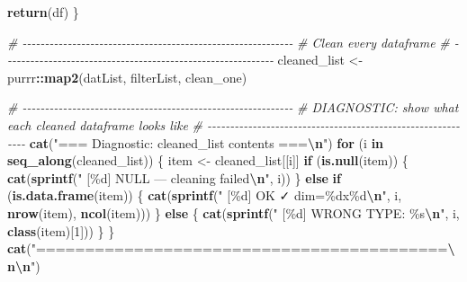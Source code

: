 \documentclass[
]{article}
\newenvironment{Shaded}{\begin{snugshade}}{\end{snugshade}}
\newcommand{\CommentTok}[1]{\textcolor[rgb]{0.56,0.35,0.01}{\textit{#1}}}
\newcommand{\ControlFlowTok}[1]{\textcolor[rgb]{0.13,0.29,0.53}{\textbf{#1}}}
\newcommand{\DecValTok}[1]{\textcolor[rgb]{0.00,0.00,0.81}{#1}}
\newcommand{\FunctionTok}[1]{\textcolor[rgb]{0.13,0.29,0.53}{\textbf{#1}}}
\newcommand{\NormalTok}[1]{#1}
\newcommand{\OtherTok}[1]{\textcolor[rgb]{0.56,0.35,0.01}{#1}}
\newcommand{\SpecialCharTok}[1]{\textcolor[rgb]{0.81,0.36,0.00}{\textbf{#1}}}
\newcommand{\StringTok}[1]{\textcolor[rgb]{0.31,0.60,0.02}{#1}}
\begin{document}
\begin{Shaded}
\begin{Highlighting}[]
    \FunctionTok{return}\NormalTok{(df)}
\NormalTok{  \}}
    
  \CommentTok{\# {-}{-}{-}{-}{-}{-}{-}{-}{-}{-}{-}{-}{-}{-}{-}{-}{-}{-}{-}{-}{-}{-}{-}{-}{-}{-}{-}{-}{-}{-}{-}{-}{-}{-}{-}{-}{-}{-}{-}{-}{-}{-}{-}{-}{-}{-}{-}{-}{-}{-}{-}{-}{-}{-}{-}{-}{-}{-}{-}{-}}
  \CommentTok{\# Clean every dataframe}
  \CommentTok{\# {-}{-}{-}{-}{-}{-}{-}{-}{-}{-}{-}{-}{-}{-}{-}{-}{-}{-}{-}{-}{-}{-}{-}{-}{-}{-}{-}{-}{-}{-}{-}{-}{-}{-}{-}{-}{-}{-}{-}{-}{-}{-}{-}{-}{-}{-}{-}{-}{-}{-}{-}{-}{-}{-}{-}{-}{-}{-}{-}{-}}
\NormalTok{  cleaned\_list }\OtherTok{\textless{}{-}}\NormalTok{ purrr}\SpecialCharTok{::}\FunctionTok{map2}\NormalTok{(datList, filterList, clean\_one)}
    
  \CommentTok{\# {-}{-}{-}{-}{-}{-}{-}{-}{-}{-}{-}{-}{-}{-}{-}{-}{-}{-}{-}{-}{-}{-}{-}{-}{-}{-}{-}{-}{-}{-}{-}{-}{-}{-}{-}{-}{-}{-}{-}{-}{-}{-}{-}{-}{-}{-}{-}{-}{-}{-}{-}{-}{-}{-}{-}{-}{-}{-}{-}{-}}
  \CommentTok{\# DIAGNOSTIC: show what each cleaned dataframe looks like}
  \CommentTok{\# {-}{-}{-}{-}{-}{-}{-}{-}{-}{-}{-}{-}{-}{-}{-}{-}{-}{-}{-}{-}{-}{-}{-}{-}{-}{-}{-}{-}{-}{-}{-}{-}{-}{-}{-}{-}{-}{-}{-}{-}{-}{-}{-}{-}{-}{-}{-}{-}{-}{-}{-}{-}{-}{-}{-}{-}{-}{-}{-}{-}}
  \FunctionTok{cat}\NormalTok{(}\StringTok{"=== Diagnostic: cleaned\_list contents ===}\SpecialCharTok{\textbackslash{}n}\StringTok{"}\NormalTok{)}
  \ControlFlowTok{for}\NormalTok{ (i }\ControlFlowTok{in} \FunctionTok{seq\_along}\NormalTok{(cleaned\_list)) \{}
\NormalTok{    item }\OtherTok{\textless{}{-}}\NormalTok{ cleaned\_list[[i]]}
    \ControlFlowTok{if}\NormalTok{ (}\FunctionTok{is.null}\NormalTok{(item)) \{}
      \FunctionTok{cat}\NormalTok{(}\FunctionTok{sprintf}\NormalTok{(}\StringTok{"  [\%d] NULL — cleaning failed}\SpecialCharTok{\textbackslash{}n}\StringTok{"}\NormalTok{, i))}
\NormalTok{    \} }\ControlFlowTok{else} \ControlFlowTok{if}\NormalTok{ (}\FunctionTok{is.data.frame}\NormalTok{(item)) \{}
      \FunctionTok{cat}\NormalTok{(}\FunctionTok{sprintf}\NormalTok{(}\StringTok{"  [\%d] OK ✓  dim=\%dx\%d}\SpecialCharTok{\textbackslash{}n}\StringTok{"}\NormalTok{, }
\NormalTok{                  i, }\FunctionTok{nrow}\NormalTok{(item), }\FunctionTok{ncol}\NormalTok{(item)))}
\NormalTok{    \} }\ControlFlowTok{else}\NormalTok{ \{}
      \FunctionTok{cat}\NormalTok{(}\FunctionTok{sprintf}\NormalTok{(}\StringTok{"  [\%d] WRONG TYPE: \%s}\SpecialCharTok{\textbackslash{}n}\StringTok{"}\NormalTok{, i, }\FunctionTok{class}\NormalTok{(item)[}\DecValTok{1}\NormalTok{]))}
\NormalTok{    \}}
\NormalTok{  \}}
  \FunctionTok{cat}\NormalTok{(}\StringTok{"==========================================}\SpecialCharTok{\textbackslash{}n\textbackslash{}n}\StringTok{"}\NormalTok{)}
    

\end{Highlighting}
\end{Shaded}
\end{document}
